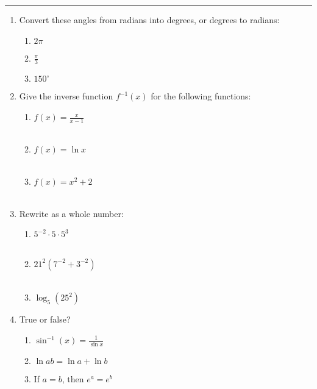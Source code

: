 \documentclass[11pt]{article}
\begin{document}
\Large



\medskip\hrule
\vspace{10pt}

\begin{enumerate}

\item Convert these angles from radians into degrees, or degrees to radians:
\begin{enumerate}
    \item{$2\pi$} \\
    \item $\frac{\pi}{3}$ \\
    \item $150^{\circ}$ \\
\end{enumerate}

\item Give the inverse function $f^{-1}(x)$ for the following functions:

\begin{enumerate}
    \item $f(x) = \frac{x}{x-1}$ \\ \\
    \item $f(x) = \ln{x}$ \\ \\
    \item $f(x) = x^2 + 2$ \\ \\ 
\end{enumerate}

\item Rewrite as a whole number:
\begin{enumerate}
    \item $5^{-2} \cdot 5 \cdot 5^3$ \\ \\
    \item $21^2(7^{-2} + 3^{-2})$ \\ \\
    \item $\log_5(25^2)$ \\ 
\end{enumerate}


\item True or false?
\begin{enumerate}
    \item $\sin^{-1}(x) = \frac{1}{\sin{x}}$
    \item $\ln{ab} = \ln{a} + \ln{b}$
    \item If $a = b$, then $e^a = e^b$
\end{enumerate} 



\end{enumerate}
\end{document}

